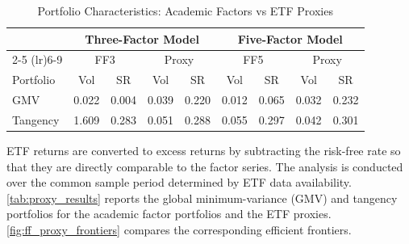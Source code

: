 \documentclass[11pt]{exam}
\begin{document}
\begin{table}[]
\centering
\setlength{\tabcolsep}{4pt}
\caption{Portfolio Characteristics: Academic Factors vs ETF Proxies}
\begin{tabular}{lcccccccc}
\toprule
& \multicolumn{4}{c}{Three-Factor Model} & \multicolumn{4}{c}{Five-Factor Model} \\
\cmidrule(lr){2-5} \cmidrule(lr){6-9}
& \multicolumn{2}{c}{FF3} & \multicolumn{2}{c}{Proxy} 
& \multicolumn{2}{c}{FF5} & \multicolumn{2}{c}{Proxy} \\
Portfolio & Vol & SR & Vol & SR & Vol & SR & Vol & SR \\
\midrule
GMV & 0.022 & 0.004 & 0.039 & 0.220 & 0.012 & 0.065 & 0.032 & 0.232 \\
Tangency & 1.609 & 0.283 & 0.051 & 0.288 & 0.055 & 0.297 & 0.042 & 0.301 \\
\bottomrule
\end{tabular}
    \label{tab:factor-v-proxy}

\end{table}


\noindent
 ETF returns are converted to excess returns by subtracting the risk-free rate so that they are directly comparable to the factor series. The analysis is conducted over the common sample period determined by ETF data availability. \autoref{tab:proxy_results} reports the global minimum-variance (GMV) and tangency portfolios for the academic factor portfolios and the ETF proxies. \autoref{fig:ff_proxy_frontiers} compares the corresponding efficient frontiers.
\end{document}

